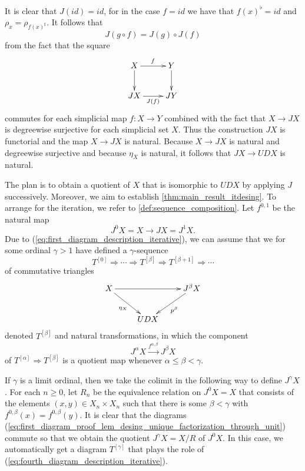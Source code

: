 It is clear that $J(id)=id$, for in the case $f=id$ we have that $f(x)^\flat =id$ and $\rho _x=\rho _{f(x)^\sharp }$. It follows that
\[J(g\circ f)=J(g)\circ J(f)\]
from the fact that the square
\begin{displaymath}
\xymatrix{
X \ar[d] \ar[r]^f & Y \ar[d] \\
JX \ar[r]_{J(f)} & JY
}
\end{displaymath}
commutes for each simplicial map $f:X\to Y$ combined with the fact that $X\to JX$ is degreewise surjective for each simplicial set $X$. Thus the construction $JX$ is functorial and the map $X\to JX$ is natural. Because $X\to JX$ is natural and degreewise surjective and because $\eta _X$ is natural, it follows that $JX\to UDX$ is natural.

The plan is to obtain a quotient of $X$ that is isomorphic to $UDX$ by applying $J$ successively. Moreover, we aim to establish \cref{thm:main_result_itdesing}. To arrange for the iteration, we refer to \cref{def:sequence_composition}. Let $f^{0,1}$ be the natural map
\[J^0X=X\to JX=J^1X.\]
Due to (\ref{eq:first_diagram_description_iterative}), we can assume that we for some ordinal $\gamma >1$ have defined a $\gamma$-sequence
\[T^{[0]}\Rightarrow \cdots \Rightarrow T^{[\beta ]}\Rightarrow T^{[\beta +1]}\Rightarrow \cdots\]
of commutative triangles
\begin{equation}
\label{eq:fourth_diagram_description_iterative}
\begin{gathered}
\xymatrix{
X \ar[dr]_{\eta _X} \ar[rr] && J^\beta X \ar[ld]^{p^\beta} \\
& UDX
}
\end{gathered}
\end{equation}
denoted $T^{[\beta ]}$ and natural transformations, in which the component
\[J^\alpha X\xrightarrow{f^{\alpha ,\beta }} J^\beta X\]
of $T^{[\alpha ]}\Rightarrow T^{[\beta ]}$ is a quotient map whenever $\alpha \leq \beta <\gamma$.

If $\gamma$ is a limit ordinal, then we take the colimit in the following way to define $J^\gamma X$. For each $n\geq 0$, let $R_n$ be the equivalence relation on $J^0X=X$ that consists of the elements $(x,y)\in X_n\times X_n$ such that there is some $\beta <\gamma$ with $f^{0,\beta }(x)=f^{0,\beta }(y)$. It is clear that the diagrams (\ref{eq:first_diagram_proof_lem_desing_unique_factorization_through_unit}) commute so that we obtain the quotient $J^\gamma X=X/R$ of $J^0X$. In this case, we automatically get a diagram $T^{[\gamma ]}$ that plays the role of (\ref{eq:fourth_diagram_description_iterative}).

